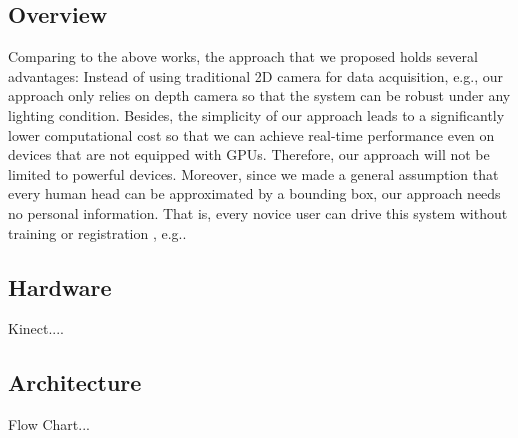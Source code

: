 \subsection{Overview}
Comparing to the above works, the approach that we proposed holds several advantages: Instead of using traditional 2D camera for data acquisition, e.g.\cite{Ref_Survey}, our approach only relies on depth camera so that the system can be robust under any lighting condition. Besides, the simplicity of our approach leads to a significantly lower computational cost so that we can achieve real-time performance even on devices that are not equipped with GPUs. Therefore, our approach will not be limited to powerful devices. Moreover, since we made a general assumption that every human head can be approximated  by a bounding box, our approach needs no personal information. That is, every novice user can drive this system without training or registration , e.g.\cite{Ref19}.

\subsection{Hardware}
Kinect....

\subsection{Architecture}
Flow Chart...